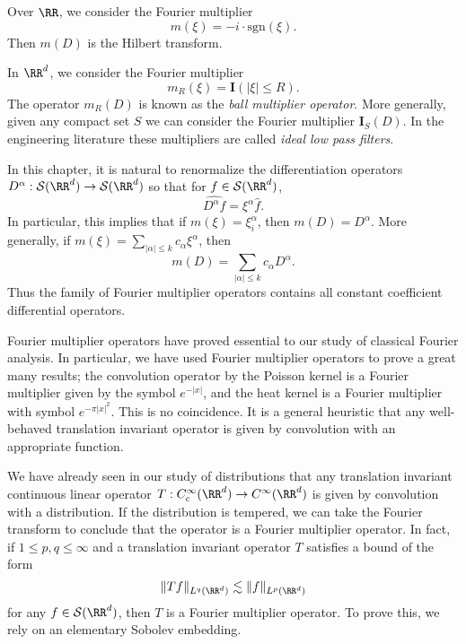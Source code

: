 \begin{example}
  Over $\RR$, we consider the Fourier multiplier
  \[ m(\xi) = - i \cdot \text{sgn}(\xi). \]
  Then $m(D)$ is the Hilbert transform.
\end{example}

\begin{example}
  In $\RR^d$, we consider the Fourier multiplier
  \[ m_R(\xi) = \mathbf{I}(|\xi| \leq R). \]
  The operator $m_R(D)$ is known as the \emph{ball multiplier operator}. More generally, given any compact set $S$ we can consider the Fourier multiplier $\mathbf{I}_S(D)$. In the engineering literature these multipliers are called \emph{ideal low pass filters}.
\end{example}

\begin{example}
  In this chapter, it is natural to renormalize the differentiation operators $D^\alpha: \mathcal{S}(\RR^d) \to \mathcal{S}(\RR^d)$ so that for $f \in \mathcal{S}(\RR^d)$,
  \[ \widehat{D^\alpha f} = \xi^\alpha \widehat{f}. \]
  In particular, this implies that if $m(\xi) = \xi_i^\alpha$, then $m(D) = D^\alpha$. More generally, if $m(\xi) = \sum_{|\alpha| \leq k} c_\alpha \xi^\alpha$, then
  \[ m(D) = \sum_{|\alpha| \leq k} c_\alpha D^\alpha. \]
  Thus the family of Fourier multiplier operators contains all constant coefficient differential operators.
\end{example}

Fourier multiplier operators have proved essential to our study of classical Fourier analysis. In particular, we have used Fourier multiplier operators to prove a great many results; the convolution operator by the Poisson kernel is a Fourier multiplier given by the symbol $e^{-|x|}$, and the heat kernel is a Fourier multiplier with symbol $e^{- \pi |x|^2}$. This is no coincidence. It is a general heuristic that any well-behaved translation invariant operator is given by convolution with an appropriate function.

We have already seen in our study of distributions that any translation invariant continuous linear operator $T: C_c^\infty(\RR^d) \to C^\infty(\RR^d)$ is given by convolution with a distribution. If the distribution is tempered, we can take the Fourier transform to conclude that the operator is a Fourier multiplier operator. In fact, if $1 \leq p,q \leq \infty$ and a translation invariant operator $T$ satisfies a bound of the form
%
\[ \| Tf \|_{L^q(\RR^d)} \lesssim \| f \|_{L^p(\RR^d)} \]
%
for any $f \in \mathcal{S}(\RR^d)$, then $T$ is a Fourier multiplier operator. To prove this, we rely on an elementary Sobolev embedding.

